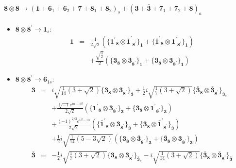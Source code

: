 \documentclass[english]{article}
\newcommand{\subcg}[3]{\big\{ {#1}\otimes{#2}\big\}^{}_{#3}}
\newcommand{\rep}[1]{\mathbf{#1}}
\begin{document}
\paragraph*{\Large $\rep{8}\otimes\rep{8}\to\left(\rep{1}+\rep{6}_{1}+\rep{6}_{2}+\rep{7}+\rep{8}_{1}+\rep{8}_{2}\right)_s+\left(\rep{3}+\rep{\bar{3}}+\rep{7}_{1}+\rep{7}_{2}+\rep{8}\right)_a$}
\begin{itemize}
\item $\rep{8}\otimes\rep{8^{\prime}}\to\rep{1}_{s}$:
\begin{eqnarray*}
\rep{1} &=& \frac{1}{2 \sqrt{2}}\left(\subcg{\rep{1^{\prime}}_{\rep{8}}}{\rep{\bar{1}^{\prime}}_{\rep{8^{\prime}}}}{\rep{1}}+\subcg{\rep{\bar{1}^{\prime}}_{\rep{8}}}{\rep{1^{\prime}}_{\rep{8^{\prime}}}}{\rep{1}}\right) \\ 
 & & +\frac{\sqrt{\frac{3}{2}}}{2}\left(\subcg{\rep{3}_{\rep{8}}}{\rep{\bar{3}}_{\rep{8^{\prime}}}}{\rep{1}}+\subcg{\rep{\bar{3}}_{\rep{8}}}{\rep{3}_{\rep{8^{\prime}}}}{\rep{1}}\right)
\end{eqnarray*}
\item $\rep{8}\otimes\rep{8^{\prime}}\to\rep{6}_{1s}$:
\begin{eqnarray*}
\rep{3} &=& i \sqrt{\frac{1}{14} \left(3+\sqrt{2}\right)}\subcg{\rep{3}_{\rep{8}}}{\rep{3}_{\rep{8^{\prime}}}}{\rep{3}}+\frac{1}{2} i \sqrt{\frac{1}{7} \left(3+\sqrt{2}\right)}\subcg{\rep{\bar{3}}_{\rep{8}}}{\rep{\bar{3}}_{\rep{8^{\prime}}}}{\rep{3}_{s}} \\ 
 & & +\frac{\sqrt[3]{-1} e^{i \alpha -i \beta }}{2 \sqrt{2}}\left(\subcg{\rep{1^{\prime}}_{\rep{8}}}{\rep{3}_{\rep{8^{\prime}}}}{\rep{3}}+\subcg{\rep{3}_{\rep{8}}}{\rep{1^{\prime}}_{\rep{8^{\prime}}}}{\rep{3}}\right) \\ 
 & & +\frac{(-1)^{2/3} e^{i \beta -i \alpha }}{2 \sqrt{2}}\left(\subcg{\rep{\bar{1}^{\prime}}_{\rep{8}}}{\rep{3}_{\rep{8^{\prime}}}}{\rep{3}}+\subcg{\rep{3}_{\rep{8}}}{\rep{\bar{1}^{\prime}}_{\rep{8^{\prime}}}}{\rep{3}}\right) \\ 
 & & +\frac{1}{2} i \sqrt{\frac{1}{14} \left(5-3 \sqrt{2}\right)}\left(\subcg{\rep{3}_{\rep{8}}}{\rep{\bar{3}}_{\rep{8^{\prime}}}}{\rep{3}}+\subcg{\rep{\bar{3}}_{\rep{8}}}{\rep{3}_{\rep{8^{\prime}}}}{\rep{3}}\right)
\\
\rep{\bar{3}} &=& -\frac{1}{2} i \sqrt{\frac{1}{7} \left(3+\sqrt{2}\right)}\subcg{\rep{3}_{\rep{8}}}{\rep{3}_{\rep{8^{\prime}}}}{\rep{\bar{3}}_{s}}-i \sqrt{\frac{1}{14} \left(3+\sqrt{2}\right)}\subcg{\rep{\bar{3}}_{\rep{8}}}{\rep{\bar{3}}_{\rep{8^{\prime}}}}{\rep{\bar{3}}} \\ 

\end{eqnarray*}
\end{itemize}
\end{document}
